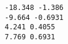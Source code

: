 \begin{lstlisting}[caption=data.dat]
-18.348 -1.386
-9.664 -0.6931
4.241 0.4055
7.769 0.6931
\end{lstlisting}
